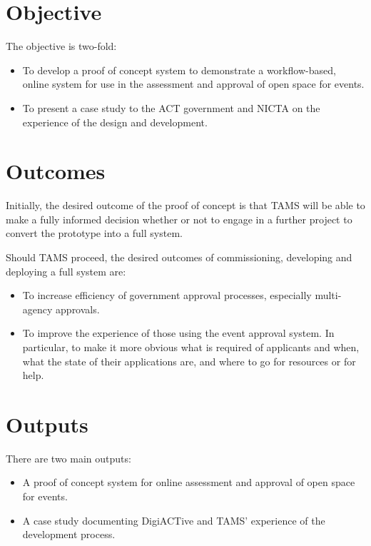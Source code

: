 \documentclass[12pt,a4paper,twosided]{article}
\begin{document}
\section{Objective}

The objective is two-fold:

\begin{itemize}
\itemsep1pt\parskip0pt
\item
  To develop a proof of concept system to demonstrate a workflow-based,
  online system for use in the assessment and approval of open space for
  events.
\item
  To present a case study to the ACT government and NICTA on the
  experience of the design and development.
\end{itemize}

\section{Outcomes}

Initially, the desired outcome of the proof of concept is that TAMS will
be able to make a fully informed decision whether or not to engage in a
further project to convert the prototype into a full system.

Should TAMS proceed, the desired outcomes of commissioning, developing
and deploying a full system are:

\begin{itemize}
\itemsep1pt\parskip0pt
\item
  To increase efficiency of government approval processes, especially
  multi-agency approvals.
\item
  To improve the experience of those using the event approval system. In
  particular, to make it more obvious what is required of applicants and
  when, what the state of their applications are, and where to go for
  resources or for help.
\end{itemize}

\section{Outputs}

There are two main outputs:

\begin{itemize}
\itemsep1pt\parskip0pt
\item
  A proof of concept system for online assessment and approval of open
  space for events.
\item
  A case study documenting DigiACTive and TAMS' experience of the
  development process.
\end{itemize}
\end{document}
